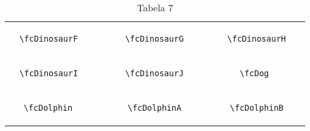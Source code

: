 \documentclass[x11names]{article}
\begin{document}
\begin{table}[H]
\begin{tabular}{|c|c|c|c|c|c|}
		&\multirow{5}{*}{	\fcDinosaurF	[scale=0.3]} & &\multirow{5}{*}{	\fcDinosaurG	[scale=0.3]} & &\multirow{5}{*}{	\fcDinosaurH	[scale=0.3]}\\	& & & & & \\	& & & & & \\	\verb|	\fcDinosaurF	| & & \verb|	\fcDinosaurG	| & & \verb|	\fcDinosaurH	| & \\	& & & & & \\	& & & & & \\	& & & & & \\	\hline									
		&\multirow{5}{*}{	\fcDinosaurI	[scale=0.3]} & &\multirow{5}{*}{	\fcDinosaurJ	[scale=0.3]} & &\multirow{5}{*}{	\fcDog	[scale=0.8]}\\	& & & & & \\	& & & & & \\	\verb|	\fcDinosaurI	| & & \verb|	\fcDinosaurJ	| & & \verb|	\fcDog	| & \\	& & & & & \\	& & & & & \\	& & & & & \\	\hline									
		&\multirow{5}{*}{	\fcDolphin	[scale=0.8]} & &\multirow{5}{*}{	\fcDolphinA	[scale=0.4]} & &\multirow{5}{*}{	\fcDolphinB	[scale=0.4]}\\	& & & & & \\	& & & & & \\	\verb|	\fcDolphin	| & & \verb|	\fcDolphinA	| & & \verb|	\fcDolphinB	| & \\	& & & & & \\	& & & & & \\	& & & & & \\		\hline 	\hline 	\end{tabular}	\caption{	Tabela 7	}\label{	Tab7	}\end{table}
\end{document}
